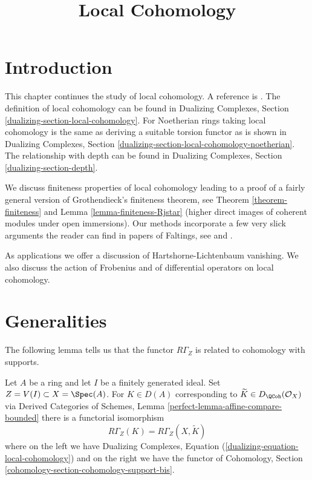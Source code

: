 

%


\title{Local Cohomology}


\maketitle

\label{section-phantom}

\tableofcontents

\section{Introduction}
\label{section-introduction}

\noindent
This chapter continues the study of local cohomology.
A reference is \cite{SGA2}.
The definition of local cohomology can be found in
Dualizing Complexes, Section \ref{dualizing-section-local-cohomology}.
For Noetherian rings taking local cohomology is the same
as deriving a suitable torsion functor as is shown in
Dualizing Complexes, Section
\ref{dualizing-section-local-cohomology-noetherian}.
The relationship with depth can be found in
Dualizing Complexes, Section
\ref{dualizing-section-depth}.

\medskip\noindent
We discuss finiteness properties of local cohomology leading to a proof
of a fairly general version of
Grothendieck's finiteness theorem, see Theorem \ref{theorem-finiteness}
and Lemma \ref{lemma-finiteness-Rjstar} (higher direct images
of coherent modules under open immersions).
Our methods incorporate a few very slick arguments the reader
can find in papers of Faltings, see
\cite{Faltings-annulators} and \cite{Faltings-finiteness}.

\medskip\noindent
As applications we offer a discussion of
Hartshorne-Lichtenbaum vanishing. We also discuss
the action of Frobenius and of differential operators
on local cohomology.




\section{Generalities}
\label{section-generalities}

\noindent
The following lemma tells us that the functor $R\Gamma_Z$
is related to cohomology with supports.

\begin{lemma}
\label{lemma-local-cohomology-is-local-cohomology}
Let $A$ be a ring and let $I$ be a finitely generated ideal.
Set $Z = V(I) \subset X = \Spec(A)$. For $K \in D(A)$ corresponding
to $\widetilde{K} \in D_\QCoh(\mathcal{O}_X)$ via
Derived Categories of Schemes, Lemma \ref{perfect-lemma-affine-compare-bounded}
there is a functorial isomorphism
$$
R\Gamma_Z(K) = R\Gamma_Z(X, \widetilde{K})
$$
where on the left we have
Dualizing Complexes, Equation (\ref{dualizing-equation-local-cohomology})
and on the right we have the functor of
Cohomology, Section \ref{cohomology-section-cohomology-support-bis}.
\end{lemma}

